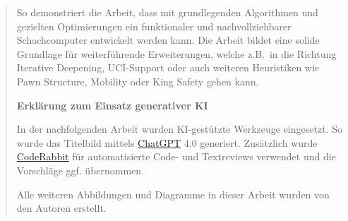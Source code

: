 \begin{abstract}
    So demonstriert die Arbeit, dass mit grundlegenden Algorithmen und gezielten Optimierungen ein funktionaler und nachvollziehbarer Schachcomputer entwickelt werden kann.
    Die Arbeit bildet eine solide Grundlage für weiterführende Erweiterungen, welche z.B.\ in die Richtung Iterative Deepening, UCI-Support oder auch weiteren Heuristiken wie Pawn Structure, Mobility oder King Safety gehen kann.

    \vspace{1.5em}

    \begin{center}
        \textbf{Erklärung zum Einsatz generativer KI}
    \end{center}

    In der nachfolgenden Arbeit wurden KI-gestützte Werkzeuge eingesetzt. So wurde das Titelbild mittels \href{https://chatgpt.com/}{ChatGPT} 4.0 generiert.
    Zusätzlich wurde \href{https://www.coderabbit.ai/}{CodeRabbit} für automatisierte Code- und Textreviews verwendet und die Vorschläge ggf. übernommen.

    Alle weiteren Abbildungen und Diagramme in dieser Arbeit wurden von den Autoren erstellt.
\end{abstract}

